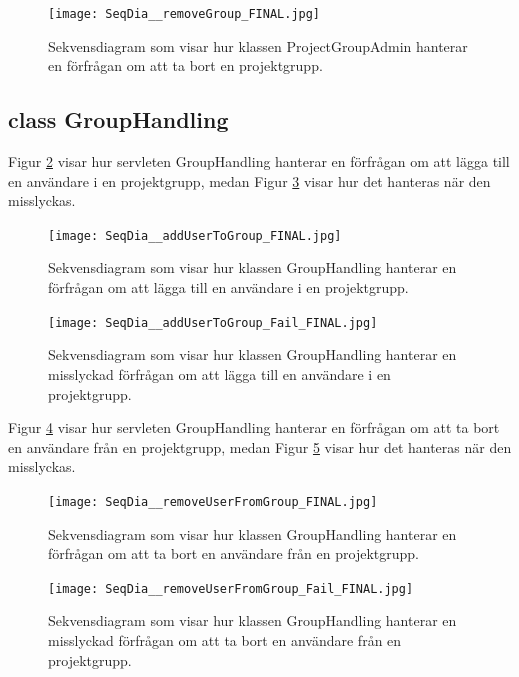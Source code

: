 \documentclass[a4paper]{article}
\begin{document}
\begin{figure}[h!]
\centering
\texttt{[image: SeqDia\_\_removeGroup\_FINAL.jpg]}
\caption{Sekvensdiagram som visar hur klassen ProjectGroupAdmin hanterar en förfrågan om att ta bort en projektgrupp.
\label{removeGroup}}
\end{figure}



\subsection{class GroupHandling}
Figur \ref{addUserToGroup} visar hur servleten GroupHandling hanterar en förfrågan om att lägga till en användare i en projektgrupp, medan Figur \ref{addUserToGroupFail} visar hur det hanteras när den misslyckas.

\begin{figure}[h!]
\centering
\texttt{[image: SeqDia\_\_addUserToGroup\_FINAL.jpg]}
\caption{Sekvensdiagram som visar hur klassen GroupHandling hanterar en förfrågan om att lägga till en användare i en projektgrupp.
\label{addUserToGroup}}
\end{figure}

\begin{figure}[h!]
\centering
\texttt{[image: SeqDia\_\_addUserToGroup\_Fail\_FINAL.jpg]}
\caption{Sekvensdiagram som visar hur klassen GroupHandling hanterar en misslyckad förfrågan om att lägga till en användare i en projektgrupp.
\label{addUserToGroupFail}}
\end{figure}

\noindent
Figur \ref{removeUserFromGroup} visar hur servleten GroupHandling hanterar en förfrågan om att ta bort en användare från en projektgrupp, medan Figur \ref{removeUserFromGroupFail} visar hur det hanteras när den misslyckas.

\begin{figure}[h!]
\centering
\texttt{[image: SeqDia\_\_removeUserFromGroup\_FINAL.jpg]}
\caption{Sekvensdiagram som visar hur klassen GroupHandling hanterar en förfrågan om att ta bort en användare från en projektgrupp.
\label{removeUserFromGroup}}
\end{figure}

\begin{figure}[h!]
\centering
\texttt{[image: SeqDia\_\_removeUserFromGroup\_Fail\_FINAL.jpg]}
\caption{Sekvensdiagram som visar hur klassen GroupHandling hanterar en misslyckad förfrågan om att ta bort en användare från en projektgrupp.
\label{removeUserFromGroupFail}}
\end{figure}
\end{document}
